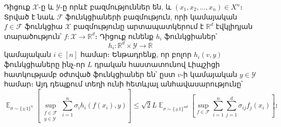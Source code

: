 \documentclass[12pt]{article}
\DeclareMathOperator*{\E}{\mathbb{E}}
\begin{document}
\begin{theorem}
\label{contr_theorem}
Դիցուք $\mathcal{X}$-ը և $\mathcal{Y}$-ը որևէ բազմություններ են,  և $(x_1, x_2, ..., x_n) \in X^n$։ Տրված է նաև $\mathcal{F}$ ֆունկցիաների բազմություն, որի կամայական $f \in \mathcal{F}$ ֆունկցիա $\mathcal{X}$ բազմությունը արտապատկերում է $\mathbb{R}^d$ էվկլիդյան տարածություն՝ $f:\mathcal{X} \rightarrow \mathbb{R}^d$։ Դիցուք ունենք $h_i$ ֆունկցիաներ՝ $$h_i:\mathbb{R}^d \times \mathcal{Y} \rightarrow \mathbb{R}$$ կամայական $i \in [n]$ համար։ Ենթադրենք, որ բոլոր $h_i(v, y)$ ֆունկցիաները ինչ-որ $L$ դրական հաստատունով Լիպշիցի հատկությամբ օժտված ֆունկցիաներ են՝ ըստ $v$-ի կամայական $y \in \mathcal{Y}$ համար։ Այդ դեպքում տեղի ունի հետևյալ անհավասարությունը՝
\begin{equation}
\label{contradiction_ineq}
\E_{\sigma \sim \{\pm 1\}^n}\left[\sup_{\substack{f \in \mathcal{F} \\ y \in \mathcal{Y}} }  \sum_{i=1}^n{\sigma_ih_i(f(x_i), y)}  \right]    \leq \sqrt{2}L \E_{\sigma \sim \{\pm1\}^{nd}} \left[  \sup_{f \in \mathcal{F}}  \sum_{i=1}^n\sum_{j=1}^d{\sigma_{ij}f_j(x_i)}   \right]։
\end{equation}
\end{theorem}
\end{document}

